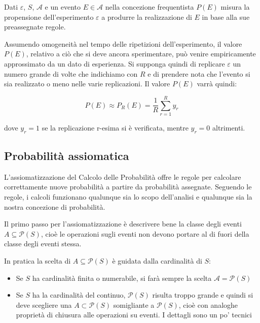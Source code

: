 \begin{flushleft}

Dati $\varepsilon$, $S$, $\mathcal{A}$ e un evento $E \in \mathcal{A}$ nella concezione
frequentista $P(E)$ misura la propensione dell'esperimento $\varepsilon$ a produrre la 
realizzazione di $E$ in base alla sue preassegnate regole.

Assumendo omogeneità nel tempo delle ripetizioni dell'esperimento, il valore $P(E)$,
relativo a ciò che si deve ancora sperimentare, può venire empiricamente approssimato da 
un dato di esperienza. Si supponga quindi di replicare $\varepsilon$ un numero grande di volte
che indichiamo con $R$ e di prendere nota che l'evento si sia realizzato o meno nelle varie
replicazioni. Il valore $P(E)$ varrà quindi:

\[ P(E) \approx P_{R}(E) = \frac 1 R \sum_{r = 1}^R y_r \]

dove $y_r = 1$ se la replicazione r-esima si è verificata, mentre $y_r = 0$ altrimenti.

\end{flushleft}

\subsection{Probabilità assiomatica}

\begin{flushleft}

L'assiomatizzazione del Calcolo delle Probabilità offre le regole per calcolare 
correttamente nuove probabilità a partire da probabilità assegnate. Seguendo le regole, i
calcoli funzionano qualunque sia lo scopo dell'analisi e qualunque sia la nostra concezione
di probabilità.

Il primo passo per l'assiomatizzazione è descrivere bene la classe degli eventi 
$A \subseteq \mathcal{P}(S)$, cioè le operazioni sugli eventi non devono portare al di fuori
della classe degli eventi stessa.

In pratica la scelta di $A \subseteq \mathcal{P}(S)$ è guidata dalla cardinalità di $S$:

\begin{itemize}
\item{Se $S$ ha cardinalità finita o numerabile, si farà sempre la scelta 
$\mathcal{A} = \mathcal{P}(S)$}

\item{Se $S$ ha la cardinalità del continuo, $\mathcal{P}(S)$ risulta troppo grande e quindi
si deve scegliere una $A \subset \mathcal{P}(S)$ somigliante a $\mathcal{P}(S)$, cioè con 
analoghe proprietà di chiusura alle operazioni su eventi. I dettagli sono un po' tecnici}
\end{itemize}

\end{flushleft}

